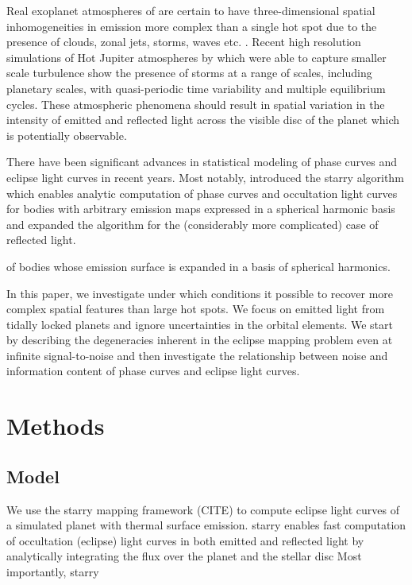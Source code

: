 \documentclass[modern]{aastex631}
\begin{document}
Real exoplanet atmospheres of are certain to have three-dimensional spatial 
inhomogeneities in emission more complex than a single hot spot due to the presence of clouds, zonal 
jets, storms, waves etc. \citep{showman2020}.
Recent high resolution simulations of Hot Jupiter atmospheres by \cite{cho2021} which were able 
to capture smaller scale turbulence show the presence of storms at a range of scales, including 
planetary scales, with quasi-periodic time variability and multiple equilibrium cycles.
These atmospheric phenomena should result in spatial variation in the intensity of emitted 
and reflected light across the visible disc of the planet which is potentially observable.

There have been significant advances in statistical modeling of phase curves and eclipse light
curves in recent years.
Most notably, \cite{luger2019a} introduced the \textsf{starry} algorithm which enables analytic
computation of phase curves and occultation light curves for bodies with arbitrary emission maps 
expressed in a spherical harmonic basis and\cite{luger2021d} expanded the algorithm for the (considerably more complicated) case of 
reflected light.
\cite{luger2021e} 

of bodies whose emission surface is 
expanded in a basis of spherical harmonics. 


In this paper, we investigate under which conditions it possible to recover more complex 
spatial features than large hot spots. 
We focus on emitted light from tidally locked planets and ignore uncertainties in the 
orbital elements.  
We start by describing the degeneracies inherent in the eclipse mapping problem even at 
infinite signal-to-noise and then investigate the relationship between noise and information 
content of phase curves and eclipse light curves. 


\section{Methods}
\label{sec:methods}

\subsection{Model}
\label{ssec:model}
We use the \textsf{starry} mapping framework (CITE) to compute eclipse light curves of a simulated planet with thermal surface emission.
\textsf{starry} enables fast computation of occultation (eclipse) light curves in both emitted and reflected light by analytically integrating the flux over the planet and the stellar disc 
Most importantly, \textsf{starry} 
\end{document}
